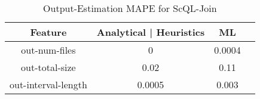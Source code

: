 \begin{table}[t]
\centering
\caption{Output-Estimation MAPE for ScQL-Join}\label{tab:output-estimation}
 \begin{tabular}{|c|c|c|c|}
        \hline
        \textbf{Feature} & \textbf{Analytical} | \textbf{Heuristics} & \textbf{ML} \\
        \hline
        out-num-files & 0  & 0.0004 \\
        out-total-size & 0.02 & 0.11 \\
        out-interval-length & 0.0005 & 0.003 \\\hline
\end{tabular}
\end{table}